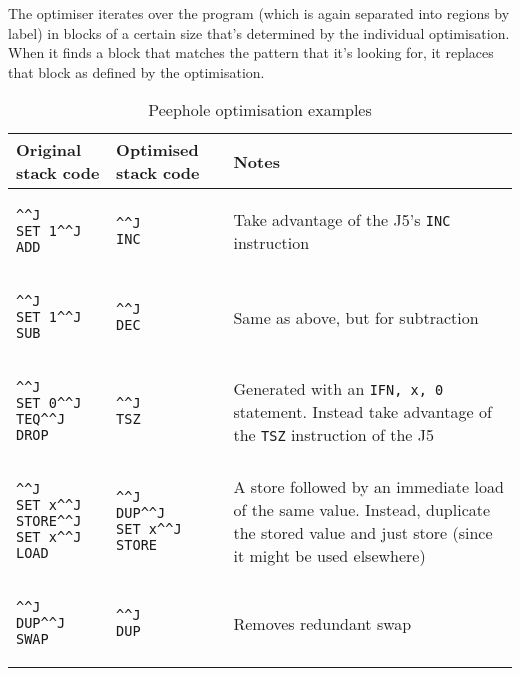 The optimiser iterates over the program (which is again separated into regions
by label) in blocks of a certain size that's determined by the individual
optimisation. When it finds a block that matches the pattern that it's looking
for, it replaces that block as defined by the optimisation.

\begin{table}
\caption{Peephole optimisation examples}
\begin{tabularx}{\linewidth}{l l X}\label{tab:peepholeex}
Original stack code & Optimised stack code & Notes \\ \toprule
\begin{lstlisting}^^J
SET 1^^J
ADD
\end{lstlisting} &
\begin{lstlisting}^^J
INC
\end{lstlisting} &
Take advantage of the J5's {\lstinline!INC!} instruction \\ \midrule
\begin{lstlisting}^^J
SET 1^^J
SUB
\end{lstlisting} &
\begin{lstlisting}^^J
DEC
\end{lstlisting} &
Same as above, but for subtraction \\ \midrule
\begin{lstlisting}^^J
SET 0^^J
TEQ^^J
DROP
\end{lstlisting} &
\begin{lstlisting}^^J
TSZ
\end{lstlisting} &
Generated with an {\lstinline!IFN, x, 0!} statement. Instead take advantage of
the {\lstinline!TSZ!} instruction of the J5 \\ \midrule
\begin{lstlisting}^^J
SET x^^J
STORE^^J
SET x^^J
LOAD
\end{lstlisting} &
\begin{lstlisting}^^J
DUP^^J
SET x^^J
STORE
\end{lstlisting} &
A store followed by an immediate load of the same value. Instead, duplicate the
stored value and just store (since it might be used elsewhere) \\ \midrule
\begin{lstlisting}^^J
DUP^^J
SWAP
\end{lstlisting} &
\begin{lstlisting}^^J
DUP
\end{lstlisting} &
Removes redundant swap \\ \midrule

\end{tabularx}
\end{table}
